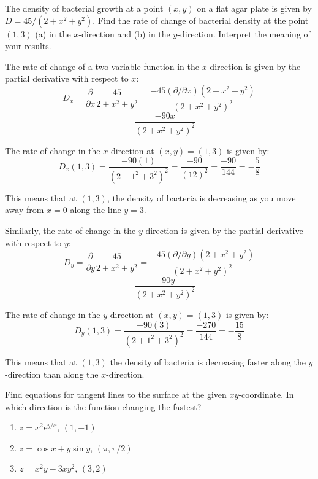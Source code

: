 \begin{Worked}
\begin{Problem}
The density of bacterial growth at a point $(x, y)$ on a 
flat agar plate is given by $D = 45/\left(2 + x^2 + y^2 \right)$. Find the 
rate of change of bacterial density at the point $(1, 3)$ (a) in the 
$x$-direction and (b) in the $y$-direction. Interpret the meaning of your 
results. 
\end{Problem}
\begin{Solution}
The rate of change of a two-variable function in the 
$x$-direction is given by the partial derivative with respect to $x$:
$$D_x = \frac{\partial}{\partial x} \frac{45}{2 + x^2 + y^2} = \frac{-45 
\left( \partial/\partial x \right) \left(2 + x^2 + y^2 \right)}{\left(2 + 
x^2 + y^2 \right)^2}$$
$$= \frac{-90x}{\left( 2 + x^2 + y^2 \right)^2}$$

The rate of change in the $x$-direction at $(x, y) = (1, 3)$ is given by:
$$D_x(1, 3) = \frac{-90(1)}{\left( 2 + 1^2 + 3^2 \right)^2} = \frac{-90}{\left(
12 \right)^2} = \frac{-90}{144} = -\frac{5}{8}$$

This means that at $(1, 3)$, the density of bacteria is decreasing as you move 
away from $x = 0$ along the line $y = 3$.

Similarly, the rate of change in the $y$-direction is given by the partial 
derivative with respect to $y$:
$$D_y = \frac{\partial}{\partial y} \frac{45}{2 + x^2 + y^2} = \frac{-45 \left(
\partial/\partial y \right) \left(2 + x^2 + y^2 \right)}{\left( 2 + x^2 + y^2 
\right)^2}$$
$$= \frac{-90y}{\left(2 + x^2 + y^2 \right)^2}$$

The rate of change in the $y$-direction at $(x, y) = (1, 3)$ is given by:
$$D_y(1, 3) = \frac{-90(3)}{\left(2 + 1^2 + 3^2 \right)^2} = \frac{-270}{144} 
= -\frac{15}{8}$$

This means that at $(1, 3)$ the density of bacteria is decreasing faster along 
the $y$-direction than along the $x$-direction. 
\end{Solution}
\end{Worked}

\begin{Exercise}[title = {Using partial derivatives to find tangent lines}, 
label = tangent]
Find equations for tangent lines to the surface at the given $xy$-coordinate. 
In which direction is the function changing the fastest?
\begin{enumerate}
\item $z = x^2e^{y/x}$, $(1, -1)$
\item $z = \cos{x} + y\sin{y}$, $(\pi, \pi/2)$
\item $z = x^2y - 3xy^2$, $(3, 2)$
\end{enumerate}
\end{Exercise}

